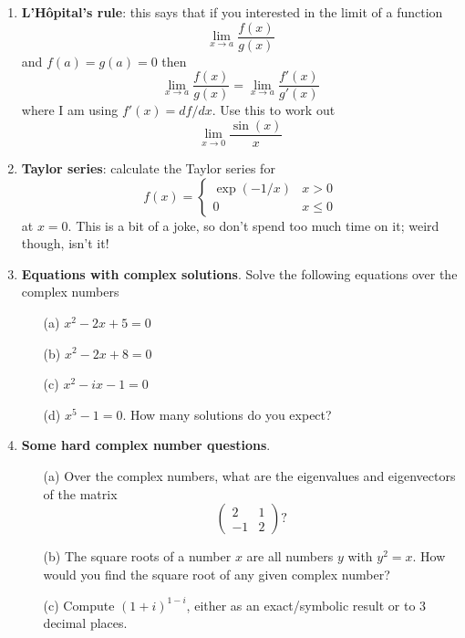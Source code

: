 \documentclass[11pt,a4paper]{scrartcl}
\begin{document}
\begin{enumerate}

 \item \textbf{L'H\^{o}pital's rule}: this says that if you interested in the limit of a function
  \begin{equation}
    \lim_{x\rightarrow a}\frac{f(x)}{g(x)}
  \end{equation}
  and $f(a)=g(a)=0$ then
\begin{equation}
    \lim_{x\rightarrow a}\frac{f(x)}{g(x)}=\lim_{x\rightarrow a}\frac{f'(x)}{g'(x)}
  \end{equation}
where I am using $f'(x)=df/dx$. Use this to work out
\begin{equation}
  \lim_{x\rightarrow 0}\frac{\sin(x)}{x}
\end{equation}
  
\item \textbf{Taylor series}: calculate the Taylor series for
\begin{equation}
  f(x)=\left\{\begin{array}{ll}\exp{(-1/x)}&x>0\\0&x\le 0\end{array}\right.
\end{equation}
at $x=0$. This is a bit of a joke, so don't spend too much time on it; weird though, isn't it!


\item \textbf{Equations with complex solutions}. Solve the following equations over the complex numbers
  \begin{itemize}
  \item[(a)] $x^2 - 2x + 5 = 0$
  \item[(b)] $x^2-2x + 8 = 0$
  \item[(c)] $x^2 - ix - 1 = 0$
  \item[(d)] $x^5 - 1 = 0$. How many solutions do you expect?
  \end{itemize}

  \item \textbf{Some hard complex number questions}.
	\begin{itemize}
		\item[(a)] Over the complex numbers, what are the eigenvalues and eigenvectors of the matrix
		\[\left(\begin{array}{cc} 2&1 \\ -1&2 \end{array}\right)?\]
		\item[(b)] The square roots of a number $x$ are all numbers $y$ with $y^2 = x$. How would you find the square root of any given complex number?
		\item[(c)] Compute $(1+i)^{1-i}$, either as an exact/symbolic result or to 3 decimal places.
	\end{itemize}

\end{enumerate}
\end{document}
